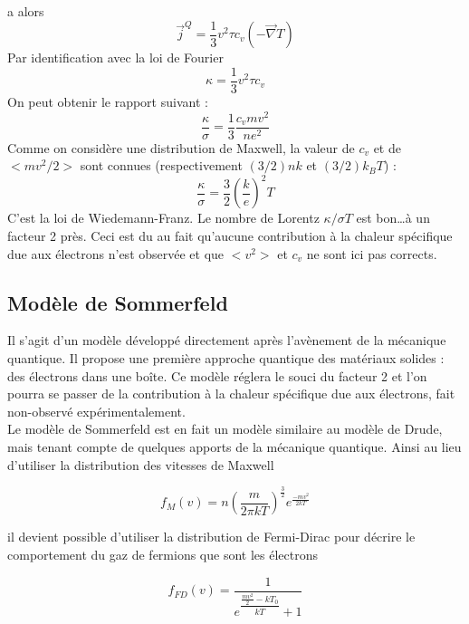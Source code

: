 a alors
\begin{equation}
	\vec{j}^Q = \frac{1}{3}v^2\tau c_v(-\vec{\nabla}T)
\end{equation}
Par identification avec la loi de Fourier 
\begin{equation}
	\kappa = \frac{1}{3}v^2 \tau c_v
\end{equation}
On peut obtenir le rapport suivant :
\begin{equation}
	\frac{\kappa}{\sigma} = \frac{1}{3}\frac{c_vmv^2}{ne^2}
\end{equation}
Comme on considère une distribution de Maxwell, la valeur de $c_v$ 
et de $<mv^2/2>$ sont connues (respectivement $(3/2)nk$ et $(3/2)k_BT$) :
\begin{equation}
	\frac{\kappa}{\sigma} = \frac{3}{2}\left(\frac{k}{e}\right)^2 T
\end{equation}
C'est la loi de Wiedemann-Franz. Le nombre de Lorentz $\kappa/\sigma T$ 
est bon\dots à un facteur 2 près. Ceci est du au fait qu'aucune 
contribution à la chaleur spécifique due aux électrons n'est observée et 
que $<v^2>$ et $c_v$ ne sont ici pas corrects.

\subsection{Modèle de Sommerfeld}
Il s'agit d'un modèle développé directement après l'avènement de la 
mécanique quantique. Il propose une première approche quantique des 
matériaux solides : des électrons dans une boîte. Ce modèle réglera 
le souci du facteur 2 et l'on pourra se passer de la contribution à 
la chaleur spécifique due aux électrons, fait non-observé 
expérimentalement.\\

Le modèle de Sommerfeld est en fait un modèle similaire au modèle de
Drude, mais tenant compte de quelques apports de la mécanique quantique.
Ainsi au lieu d'utiliser la distribution des vitesses de Maxwell

\begin{equation}
f_M(v) = n (\frac{m}{2\pi kT})^{\frac{3}{2}}e^{\frac{-mv^2}{2kT}}
\end{equation}

il devient possible d'utiliser la distribution de Fermi-Dirac pour décrire le 
comportement du gaz de fermions que sont les électrons 

\begin{equation}
f_{FD}(v) = \dfrac{1}{e^{\dfrac{\frac{mv^2}{2} - kT_0}{kT}} + 1}
\end{equation}

